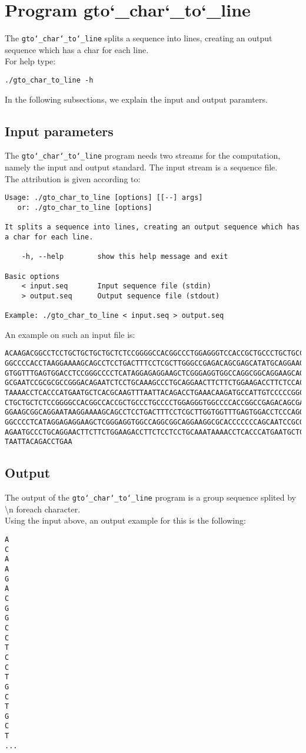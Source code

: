 \section{Program gto\char`_char\char`_to\char`_line}
The \texttt{gto\char`_char\char`_to\char`_line} splits a sequence into lines, creating an output sequence which has a char for each line.\\
For help type:
\begin{lstlisting}
./gto_char_to_line -h
\end{lstlisting}
In the following subsections, we explain the input and output paramters.

\subsection*{Input parameters}

The \texttt{gto\char`_char\char`_to\char`_line} program needs two streams for the computation,
namely the input and output standard. The input stream is a sequence file.\\
The attribution is given according to:
\begin{lstlisting}
Usage: ./gto_char_to_line [options] [[--] args]
   or: ./gto_char_to_line [options]

It splits a sequence into lines, creating an output sequence which has a char for each line.

    -h, --help        show this help message and exit

Basic options
    < input.seq       Input sequence file (stdin)
    > output.seq      Output sequence file (stdout)

Example: ./gto_char_to_line < input.seq > output.seq
\end{lstlisting}
An example on such an input file is:
\begin{lstlisting}
ACAAGACGGCCTCCTGCTGCTGCTGCTCTCCGGGGCCACGGCCCTGGAGGGTCCACCGCTGCCCTGCTGCCATTGTCCCC
GGCCCCACCTAAGGAAAAGCAGCCTCCTGACTTTCCTCGCTTGGGCCGAGACAGCGAGCATATGCAGGAAGCGGCAGGAA
GTGGTTTGAGTGGACCTCCGGGCCCCTCATAGGAGAGGAAGCTCGGGAGGTGGCCAGGCGGCAGGAAGCAGGCCAGTGCC
GCGAATCCGCGCGCCGGGACAGAATCTCCTGCAAAGCCCTGCAGGAACTTCTTCTGGAAGACCTTCTCCACCCCCCCAGC
TAAAACCTCACCCATGAATGCTCACGCAAGTTTAATTACAGACCTGAAACAAGATGCCATTGTCCCCCGGCCTCCTGCTG
CTGCTGCTCTCCGGGGCCACGGCCACCGCTGCCCTGCCCCTGGAGGGTGGCCCCACCGGCCGAGACAGCGAGCATATGCA
GGAAGCGGCAGGAATAAGGAAAAGCAGCCTCCTGACTTTCCTCGCTTGGTGGTTTGAGTGGACCTCCCAGGCCAGTGCCG
GGCCCCTCATAGGAGAGGAAGCTCGGGAGGTGGCCAGGCGGCAGGAAGGCGCACCCCCCCAGCAATCCGCGCGCCGGGAC
AGAATGCCCTGCAGGAACTTCTTCTGGAAGACCTTCTCCTCCTGCAAATAAAACCTCACCCATGAATGCTCACGCAAGTT
TAATTACAGACCTGAA
\end{lstlisting}

\subsection*{Output}
The output of the \texttt{gto\char`_char\char`_to\char`_line} program is a group sequence splited by \textbackslash n foreach character.\\
Using the input above, an output example for this is the following:
\begin{lstlisting}
A
C
A
A
G
A
C
G
G
C
C
T
C
C
T
G
C
T
G
C
T
...
\end{lstlisting}